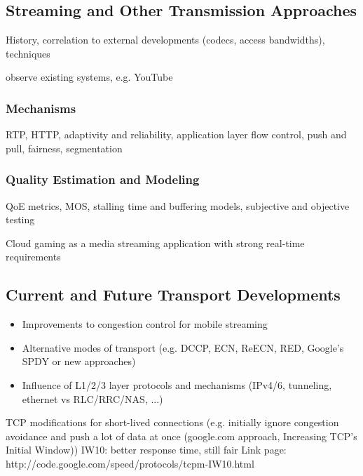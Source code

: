 \subsection{Streaming and Other Transmission Approaches}
History, correlation to external developments (codecs, access bandwidths), techniques

observe existing systems, e.g. YouTube \cite{metzger2011delivery}

\subsubsection{Mechanisms}
RTP, HTTP, adaptivity and reliability, application layer flow control, push and pull, fairness, segmentation
\subsubsection{Quality Estimation and Modeling}
QoE metrics, MOS, stalling time and buffering models, subjective and objective testing


Cloud gaming as a media streaming application with strong real-time requirements \cite{4795441,wang2009modeling,jarschel2011cloudevaluation,ct2010wolken}



\subsection{Current and Future Transport Developments}

\begin{itemize}
\item Improvements to congestion control for mobile streaming
\item Alternative modes of transport (e.g. DCCP, ECN, ReECN, RED, Google's SPDY or new approaches)
\item Influence of L1/2/3 layer protocols and mechanisms (IPv4/6, tunneling, ethernet vs RLC/RRC/NAS, ...) %

\end{itemize}


TCP modifications for short-lived connections (e.g. initially ignore congestion avoidance and push a lot of data at once (google.com approach, Increasing TCP's Initial Window)) 
IW10: better response time, still fair
Link page: http://code.google.com/speed/protocols/tcpm-IW10.html







